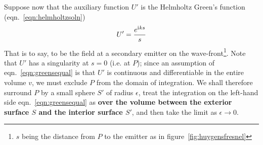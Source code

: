 Suppose now that the auxiliary function \(U'\) is the Helmholtz Green's function (eqn.~\eqref{eqn:helmholtzsoln})
%
\begin{equation}
    U' = \frac{e^{\mathrm{i}\mkern1mu k s}}{s}
\end{equation}
%
That is to say, to be the field at a secondary emitter on the wave-front\footnote{\(s\) being the distance from \(P\) to the emitter as in figure~\ref{fig:huygensfresnel}}.
%
Note that \(U'\) has a singularity at \(s = 0\) (i.e. at \(P\)); since an assumption of eqn.~\eqref{eqn:greensequal} is that \(U'\) is continuous and differentiable in the entire volume \(v\), we must exclude \(P\) from the domain of integration.
%
We shall therefore surround \(P\) by a small sphere \(S'\) of radius \(\epsilon\), treat the integration on the left-hand side eqn.~\eqref{eqn:greensequal} as \textbf{over the volume between the exterior surface \(S\) and the interior surface \(S'\)}, and then take the limit as \(\epsilon \rightarrow 0\).

